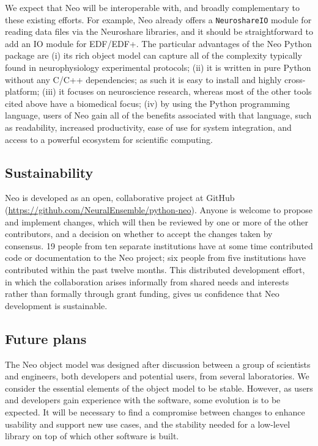 \documentclass{frontiers}
\begin{document}
We expect that Neo will be interoperable with, and broadly complementary to these existing efforts. 
For example, Neo already offers a \lstinline`NeuroshareIO` module for reading data files via the Neuroshare libraries, and it should be straightforward to add an IO module for EDF/EDF+. 
The particular advantages of the Neo Python package are 
(i) its rich object model can capture all of the complexity typically found in neurophysiology experimental protocols; 
(ii) it is written in pure Python without any C/C++ dependencies; as such it is easy to install and highly cross-platform; 
(iii) it focuses on neuroscience research, whereas most of the other tools cited above have a biomedical focus; 
(iv) by using the Python programming language, users of Neo gain all of the benefits associated with that language, such as readability, increased productivity, ease of use for system integration, and access to a powerful ecosystem for scientific computing.


\subsection{Sustainability}

Neo is developed as an open, collaborative project at GitHub
(\url{https://github.com/NeuralEnsemble/python-neo}).
Anyone is welcome to propose and implement changes, which will then be reviewed by one or more of the other contributors, and a decision on whether to accept the changes taken by consensus.
19 people from ten separate institutions have at some time contributed code or documentation to the Neo project;  six people from five institutions have contributed within the past twelve months.
This distributed development effort, in which the collaboration arises informally from shared needs and interests rather than formally through grant funding, gives us confidence that Neo development is sustainable.


\subsection{Future plans}

The Neo object model was designed after discussion between a group of scientists and engineers, both developers and potential users, from several laboratories. 
We consider the essential elements of the object model to be stable. 
However, as users and developers gain experience with the software, some evolution is to be expected.
It will be necessary to find a compromise between changes to enhance usability and support new use cases, and the stability needed for a low-level library on top of which other software is built.
\end{document}
